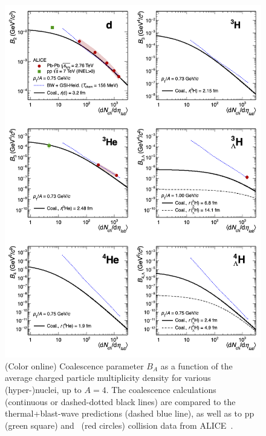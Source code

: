 \documentclass{appolb}
\begin{document}
\begin{figure}[htb]
\begin{center}
\includegraphics[width=\textwidth]{coal2Thermal2alice.png}
\caption{(Color online) Coalescence parameter $B_A$ as a function of the average charged particle multiplicity density for various (hyper-)nuclei, up to $A = 4$. The coalescence calculations (continuous or dashed-dotted black lines) are compared to the thermal+blast-wave predictions (dashed blue line), as well as to pp (green square) and \PbPb~(red circles) collision data from ALICE~\cite{ALICE:nucleipp2017,ALICE:deuteronppPbPb2015,Adam:2015yta}. }
\label{Fig:comparison}
\end{center}
\end{figure} 
\end{document}
